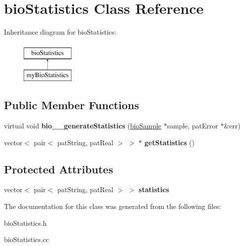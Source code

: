 \hypertarget{classbio_statistics}{}\section{bio\+Statistics Class Reference}
\label{classbio_statistics}
Inheritance diagram for bio\+Statistics\+:\begin{figure}[H]
\begin{center}
\leavevmode
\includegraphics[height=2.000000cm]{classbio_statistics}
\end{center}
\end{figure}
\subsection*{Public Member Functions}
\begin{DoxyCompactItemize}
\item 
\mbox{\label{classbio_statistics_a87b17d37672f564fb520d5ffa86b5760}} 
virtual void {\bfseries bio\+\_\+\+\_\+generate\+Statistics} (\hyperlink{classbio_sample}{bio\+Sample} $\ast$sample, pat\+Error $\ast$\&err)
\item 
\mbox{\label{classbio_statistics_a53e28b9ca47e6cc0dc8a8798076faded}} 
vector$<$ pair$<$ pat\+String, pat\+Real $>$ $>$ $\ast$ {\bfseries get\+Statistics} ()
\end{DoxyCompactItemize}
\subsection*{Protected Attributes}
\begin{DoxyCompactItemize}
\item 
\mbox{\label{classbio_statistics_aaa6d2a0508f206af33485322e2e411e4}} 
vector$<$ pair$<$ pat\+String, pat\+Real $>$ $>$ {\bfseries statistics}
\end{DoxyCompactItemize}


The documentation for this class was generated from the following files\+:\begin{DoxyCompactItemize}
\item 
bio\+Statistics.\+h\item 
bio\+Statistics.\+cc\end{DoxyCompactItemize}
